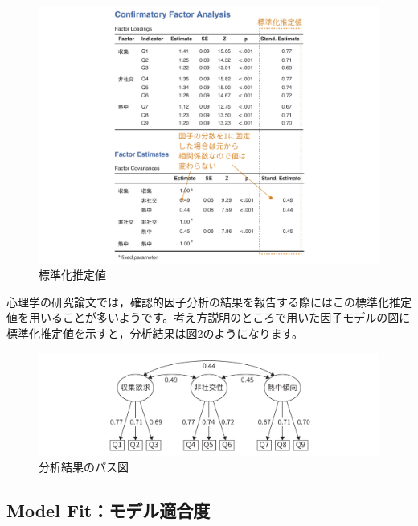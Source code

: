 \documentclass[
  12pt,
  a5jpaper,
  lualatex, ja=standard]{bxjsbook}
\begin{document}
\begin{figure}[!ht]

{\centering \includegraphics[width=1\linewidth]{images/factor/cfa-standardized} 

}

\caption{標準化推定値}\label{fig:factor-cfa-standardized}
\end{figure}

心理学の研究論文では，確認的因子分析の結果を報告する際にはこの標準化推定値を用いることが多いようです。考え方説明のところで用いた因子モデルの図に標準化推定値を示すと，分析結果は図\ref{fig:factor-cfa-result-model}のようになります。

\begin{figure}[!ht]

{\centering \includegraphics[width=1\linewidth]{images/factor/cfa-result-model} 

}

\caption{分析結果のパス図}\label{fig:factor-cfa-result-model}
\end{figure}

\hypertarget{sub:factor-cfa-model-fit}{%
\subsection{Model Fit：モデル適合度}\label{sub:factor-cfa-model-fit}}
\end{document}
